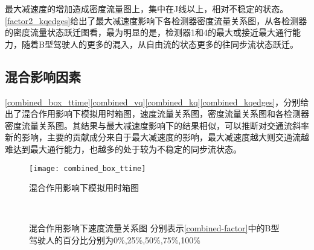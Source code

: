 最大减速度的增加造成密度流量图上，集中在J线以上，相对不稳定的状态。\autoref{factor2_kqedges}给出了最大减速度影响下各检测器密度流量关系图，从各检测器的密度流量状态跃迁图看，最为明显的是，检测器1和4的最大或接近最大通行能力，随着B型驾驶人的更多的混入，从自由流的状态更多的往同步流状态跃迁。


\subsection{混合影响因素}

\autoref{combined_box_ttime}\autoref{combined_vq}\autoref{combined_kq}\autoref{combined_kqedges}，分别给出了混合作用影响下模拟用时箱图，速度流量关系图，密度流量关系图和各检测器密度流量关系图。其结果与最大减速度影响下的结果相似，可以推断对交通流斜率新的影响，主要的贡献成分来自于最大减速度的影响，最大减速度越大则交通流越难达到最大通行能力，也越多的处于较为不稳定的同步流状态。

\begin{figure}[!htb]
\begin{center}
\texttt{[image: combined\_box\_ttime]}
\label{combined_box_ttime}
\caption{混合作用影响下模拟用时箱图}
\end{center}
\end{figure}



\begin{figure}[!htb]%
\centering
{}%
\\%
%
\caption[A set of four sub-floats.]{混合作用影响下速度流量关系图
分别表示\autoref{combined-factor}中的B型驾驶人的百分比分别为0\%,25\%,50\%,75\%,100\%}%
\label{combined_vq}%
\end{figure}


